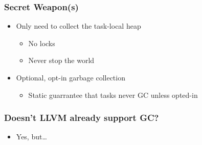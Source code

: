 \documentclass[ignorenonframetext,12pt]{beamer}
\begin{document}
\begin{frame}\frametitle{Secret Weapon(s)}
\begin{itemize}
  \item Only need to collect the task-local heap
  \begin{itemize}
    \item No locks
    \item Never stop the world
  \end{itemize}
  \item Optional, opt-in garbage collection
  \begin{itemize}
    \item Static guarrantee that tasks never GC unless opted-in
  \end{itemize}
\end{itemize}
\end{frame}

\begin{frame}\frametitle{Doesn't LLVM already support GC?}
\begin{itemize}
  \item Yes, but\ldots
\end{itemize}
\end{frame}
\end{document}
